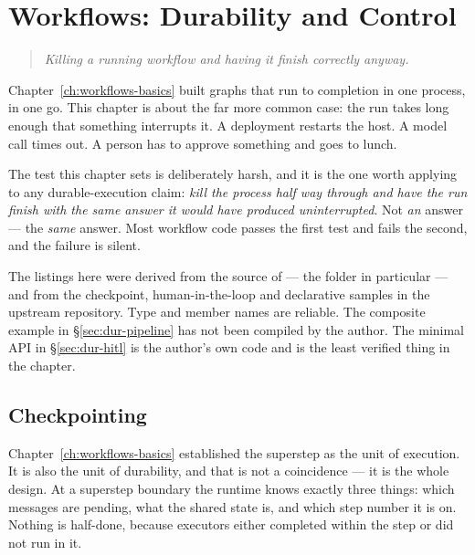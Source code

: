 \chapter{Workflows: Durability and Control}
\label{ch:workflows-advanced}

\begin{quote}\itshape
Killing a running workflow and having it finish correctly anyway.
\end{quote}

\noindent
Chapter~\ref{ch:workflows-basics} built graphs that run to completion in one
process, in one go. This chapter is about the far more common case: the run takes
long enough that something interrupts it. A deployment restarts the host. A model
call times out. A person has to approve something and goes to lunch.

The test this chapter sets is deliberately harsh, and it is the one worth
applying to any durable-execution claim: \emph{kill the process half way through
and have the run finish with the same answer it would have produced
uninterrupted}. Not \emph{an} answer --- the \emph{same} answer. Most workflow
code passes the first test and fails the second, and the failure is silent.

\begin{verifybox}
The listings here were derived from the source of
 --- the  folder in
particular --- and from the checkpoint, human-in-the-loop and declarative samples
in the upstream repository. Type and member names are reliable. The composite
example in \S\ref{sec:dur-pipeline} has not been compiled by the author. The
minimal API in \S\ref{sec:dur-hitl} is the author's own code and is the least
verified thing in the chapter.
\end{verifybox}

\section{Checkpointing}
\label{sec:dur-checkpointing}

Chapter~\ref{ch:workflows-basics} established the superstep as the unit of
execution. It is also the unit of durability, and that is not a coincidence ---
it is the whole design. At a superstep boundary the runtime knows exactly three
things: which messages are pending, what the shared state is, and which step
number it is on. Nothing is half-done, because executors either completed within
the step or did not run in it.

